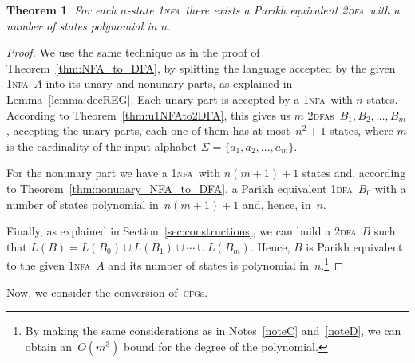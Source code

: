 \documentclass[11pt]{article}
\newcommand*{\tw}{\textsc{2}}
\newcommand*{\twdfa}{\tw\textsc{dfa}}
\newcommand*{\twdfas}{\tw\textsc{dfa}s}
\newcommand*{\ow}{\textsc{1}}
\newcommand*{\owdfa}{\ow\textsc{dfa}}
\newcommand*{\ownfa}{\ow\textsc{nfa}}
\newcommand*{\cfgs}{\textsc{cfg}s}
\newtheorem{theorem}{Theorem}[section]
\begin{document}
\begin{theorem}\label{thm:1NFAto2DFA}
  For each $n$-state \ownfa\ there exists a Parikh equivalent \twdfa\ with a number of states polynomial in $n$.
\end{theorem}
\begin{proof}
  We use the same technique as in the proof of Theorem~\ref{thm:NFA_to_DFA}, by splitting the language accepted
  by the given \ownfa\ $A$ into its unary and nonunary parts, as explained in Lemma~\ref{lemma:decREG}. 
  Each unary part is accepted by a \ownfa\ with 
  $n$ states. According to Theorem~\ref{thm:u1NFAto2DFA}, this gives us $m$ \twdfas\ $B_1,B_2,\ldots,B_m$,
  accepting the unary parts, each one
  of them has at most~$n^2+1$ states, where $m$ is the cardinality of the input alphabet
  $\Sigma=\{a_1,a_2,\ldots, a_m\}$.
    
  For the nonunary part we have a \ownfa\ with $n(m+1)+1$ states and, according to Theorem~\ref{thm:nonunary_NFA_to_DFA},
  a Parikh equivalent \owdfa\ $B_0$ with a number of states polynomial in~$n(m+1)+1$ and, hence, in~$n$.
  
  Finally, as explained in Section~\ref{sec:constructions}, we can build a \twdfa\ $B$ such that 
  $L(B)=L(B_0)\cup L(B_1)\cup\cdots\cup L(B_m)$.
  Hence, $B$ is Parikh equivalent to the given \ownfa~$A$ and its number of states is polynomial in~$n$.\footnote{By making the same considerations as in Notes~\ref{noteC} and~\ref{noteD}, we can obtain an~$O(m^3)$
  bound for the degree of the polynomial.}
\end{proof}


Now, we consider the conversion of~\cfgs.
\end{document}
